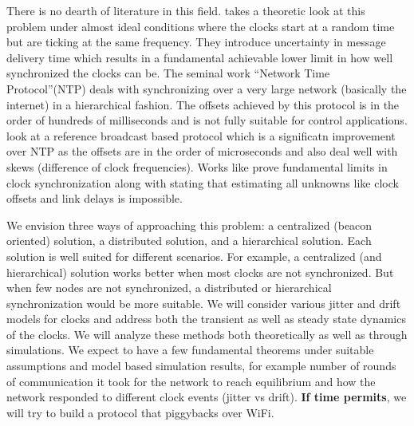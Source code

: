\documentclass[11pt, draftclsnofoot, onecolumn]{IEEEtran}
\begin{document}
There is no dearth of literature in this field.
\cite{lundelius1984upper} takes a theoretic look at this problem under almost ideal conditions where the clocks start at a random time but are ticking at the same frequency. They introduce uncertainty in message delivery time which results in a fundamental achievable lower limit in how well synchronized the clocks can be.
The seminal work ``Network Time Protocol''(NTP) \cite{mills1991internet} deals with synchronizing over a very large network (basically the internet) in a hierarchical fashion. The offsets achieved by this protocol is in the order of hundreds of milliseconds and is not fully suitable for control applications.
\cite{elson2004global, elson2002fine} look at a reference broadcast based protocol which is a significatn improvement over NTP as the offsets are in the order of microseconds and also deal well with skews (difference of clock frequencies).
Works like \cite{freris2010fundamentals, freris2007fundamental, giridhar2006distributed, freris2011fundamental} prove fundamental limits in clock synchronization along with stating that estimating all unknowns like clock offsets and link delays is impossible.

We envision three ways of approaching this problem: a centralized (beacon oriented) solution,  a distributed solution, and a hierarchical solution.
Each solution is well suited for different scenarios.
For example, a centralized (and hierarchical) solution works better when most clocks are not synchronized. But when few nodes are not synchronized, a distributed or hierarchical synchronization would be more suitable.
We will consider various jitter and drift models for clocks and address both the transient as well as steady state dynamics of the clocks.
We will analyze these methods both theoretically as well as through simulations.
We expect to have a few fundamental theorems under suitable assumptions and model based simulation results, for example number of rounds of communication it took for the network to reach equilibrium and how the network responded to different clock events (jitter vs drift).
\textbf{If time permits}, we will try to build a protocol that piggybacks over WiFi.



\end{document}
